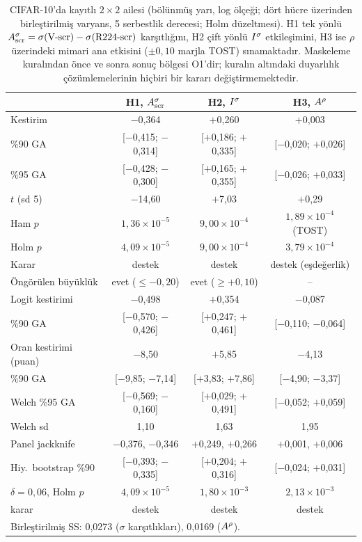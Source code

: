 \begin{table}[!t]
\centering
\caption{CIFAR-10'da kayıtlı $2\times2$ ailesi (bölünmüş yarı, log ölçeği; dört hücre üzerinden birleştirilmiş varyans, 5 serbestlik derecesi; Holm düzeltmesi). H1 tek yönlü $A^{\sigma}_{\mathrm{scr}} = \sigma(\mbox{V-scr}) - \sigma(\mbox{R224-scr})$ karşıtlığını, H2 çift yönlü $I^{\sigma}$ etkileşimini, H3 ise $\rho$ üzerindeki mimari ana etkisini ($\pm0{,}10$ marjla TOST) sınamaktadır. Maskeleme kuralından önce ve sonra sonuç bölgesi O1'dir; kuralın altındaki duyarlılık çözümlemelerinin hiçbiri bir kararı değiştirmemektedir.}
\label{tab:fb4}
\scriptsize
\setlength{\tabcolsep}{2pt}
\begin{tabular}{lccc}
\toprule
& \textbf{H1, $A^{\sigma}_{\mathrm{scr}}$} & \textbf{H2, $I^{\sigma}$} & \textbf{H3, $A^{\rho}$} \\
\midrule
Kestirim & $-$0,364 & $+$0,260 & $+$0,003 \\
\%90 GA & [$-$0,415; $-$0,314] & [$+$0,186; $+$0,335] & [$-$0,020; $+$0,026] \\
\%95 GA & [$-$0,428; $-$0,300] & [$+$0,165; $+$0,355] & [$-$0,026; $+$0,033] \\
$t$ (sd 5) & $-$14,60 & $+$7,03 & $+$0,29 \\
Ham $p$ & $1{,}36\times10^{-5}$ & $9{,}00\times10^{-4}$ & $1{,}89\times10^{-4}$ (TOST) \\
Holm $p$ & $4{,}09\times10^{-5}$ & $9{,}00\times10^{-4}$ & $3{,}79\times10^{-4}$ \\
Karar & destek & destek & destek (eşdeğerlik) \\
Öngörülen büyüklük & evet ($\leq -0{,}20$) & evet ($\geq +0{,}10$) & -- \\
\midrule
Logit kestirimi & $-$0,498 & $+$0,354 & $-$0,087 \\
\quad \%90 GA & [$-$0,570; $-$0,426] & [$+$0,247; $+$0,461] & [$-$0,110; $-$0,064] \\
Oran kestirimi (puan) & $-$8,50 & $+$5,85 & $-$4,13 \\
\quad \%90 GA & [$-$9,85; $-$7,14] & [$+$3,83; $+$7,86] & [$-$4,90; $-$3,37] \\
Welch \%95 GA & [$-$0,569; $-$0,160] & [$+$0,029; $+$0,491] & [$-$0,052; $+$0,059] \\
\quad Welch sd & 1,10 & 1,63 & 1,95 \\
Panel jackknife & $-$0,376, $-$0,346 & $+$0,249, $+$0,266 & $+$0,001, $+$0,006 \\
Hiy.\ bootstrap \%90 & [$-$0,393; $-$0,335] & [$+$0,204; $+$0,316] & [$-$0,024; $+$0,031] \\
$\delta = 0{,}06$, Holm $p$ & $4{,}09\times10^{-5}$ & $1{,}80\times10^{-3}$ & $2{,}13\times10^{-3}$ \\
\quad karar & destek & destek & destek \\
\bottomrule
\multicolumn{4}{l}{\scriptsize Birleştirilmiş SS: 0,0273 ($\sigma$ karşıtlıkları), 0,0169 ($A^{\rho}$).}
\end{tabular}
\end{table}

